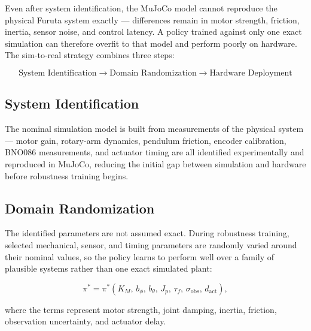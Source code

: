 \documentclass[9pt]{extarticle}
\begin{document}
Even after system identification, the MuJoCo model cannot reproduce the
physical Furuta system exactly — differences remain in motor strength,
friction, inertia, sensor noise, and control latency. A policy trained
against only one exact simulation can therefore overfit to that model and
perform poorly on hardware. The sim-to-real strategy combines three steps:

\begin{equation}
\boxed{
\text{System Identification}
\rightarrow
\text{Domain Randomization}
\rightarrow
\text{Hardware Deployment}
}
\end{equation}

\subsection{System Identification}

The nominal simulation model is built from measurements of the physical
system — motor gain, rotary-arm dynamics, pendulum friction, encoder
calibration, BNO086 measurements, and actuator timing are all identified
experimentally and reproduced in MuJoCo, reducing the initial gap between
simulation and hardware before robustness training begins.

\subsection{Domain Randomization}

The identified parameters are not assumed exact. During robustness
training, selected mechanical, sensor, and timing parameters are randomly
varied around their nominal values, so the policy learns to perform well
over a family of plausible systems rather than one exact simulated plant:

\begin{equation}
\pi^*
=
\pi^*
\left(
K_M,\,
b_\phi,\,
b_\theta,\,
J_p,\,
\tau_f,\,
\sigma_{\mathrm{obs}},\,
d_{\mathrm{act}}
\right),
\end{equation}

where the terms represent motor strength, joint damping, inertia, friction,
observation uncertainty, and actuator delay.
\end{document}
